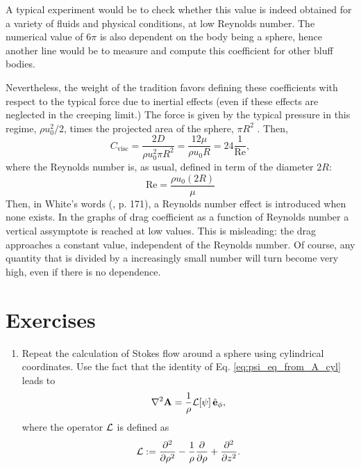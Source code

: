 A typical experiment would be to check whether this value is indeed
obtained for a variety of fluids and physical conditions, at low
Reynolds number. The numerical value of $6\pi$ is also dependent
on the body being a sphere, hence another line would be to measure
and compute this coefficient for other bluff bodies.

Nevertheless, the weight of the tradition favors defining these
coefficients with respect to the typical force due to inertial effects
(even if these effects are neglected in the creeping limit.) The force
is given by the typical pressure in this regime, $\rho u_0^2 / 2 $,
times the projected area of the sphere, $\pi R^2$ . Then,
\[
  C_\mathrm{visc} = \frac{  2 D }{ \rho u_0^2 \pi R^2 } =
  \frac{  12 \mu  }{ \rho u_0 R }   =
  24 \frac{1}{\mathrm{Re}} ,
\]
where the Reynolds number is, as usual, defined in term of the
diameter $2R$:
\[
  \mathrm{Re} = \frac{ \rho u_0 ( 2 R ) }{ \mu } 
\]
Then, in White's words (\cite{white1991viscous}, p. 171), a Reynolds
number effect is introduced when none exists. In the graphs of drag
coefficient as a function of Reynolds number a vertical assymptote is
reached at low values. This is misleading: the drag approaches a
constant value, independent of the Reynolds number. Of course, any
quantity that is divided by a increasingly small number will turn
become very high, even if there is no dependence.


\section{Exercises}


\begin{enumerate}

\item Repeat the calculation of Stokes flow around a sphere using
  cylindrical coordinates. Use the fact that the identity of
  Eq. \ref{eq:psi_eq_from_A_cyl} leads to
  \begin{equation*}
    \nabla^2 \mathbf{A} = \frac{1}{\rho } {\cal L} [\psi] \, \hat{\mathbf{e}}_\phi ,
  \end{equation*}
  where the operator $\cal L$ is defined as
  \[
    {\cal L} :=
    \frac{\partial^2  }{\partial \rho^2} -
    \frac{1}{ \rho } 
    \frac{\partial  }{\partial \rho} +
    \frac{\partial^2  }{\partial z^2}.
  \]
\end{enumerate}